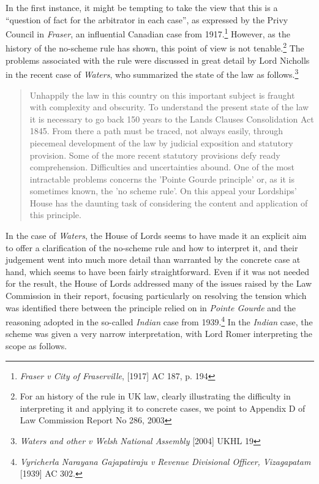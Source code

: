 In the first instance, it might be tempting to take the view that this is a ``question of fact for the arbitrator in each case'', as expressed by the Privy Council in \emph{Fraser}, an influential Canadian case from 1917.\footnote{\emph{Fraser v City of Fraserville}, [1917] AC 187, p. 194} However, as the history of the no-scheme rule has shown, this point of view is not tenable.\footnote{For an history of the rule in UK law, clearly illustrating the difficulty in interpreting it and applying it to concrete cases, we point to Appendix D of Law Commission Report No 286, 2003} The problems associated with the rule were discussed in great detail by Lord Nicholls in the recent case of \emph{Waters}, who summarized the state of the law as follows.\footnote{\emph{Waters and other v Welsh National Assembly} [2004] UKHL 19}

\begin{quote}
Unhappily the law in this country on this important subject is fraught with complexity and obscurity. To understand the present state of the law it is necessary to go back 150 years to the Lands Clauses Consolidation Act 1845. From there a path must be traced, not always easily, through piecemeal development of the law by judicial exposition and statutory provision. Some of the more recent statutory provisions defy ready comprehension. Difficulties and uncertainties abound. One of the most intractable problems concerns the 'Pointe Gourde principle' or, as it is sometimes known, the 'no scheme rule'. On this appeal your Lordships' House has the daunting task of considering the content and application of this principle.
\end{quote}

In the case of \emph{Waters}, the House of Lords seems to have made it an explicit aim to offer a clarification of the no-scheme rule and how to interpret it, and their judgement went into much more detail than warranted by the concrete case at hand, which seems to have been fairly straightforward. Even if it was not needed for the result, the House of Lords addressed many of the issues raised by the Law Commission in their report, focusing particularly on resolving the tension which was identified there between the principle relied on in \emph{Pointe Gourde} and the reasoning adopted in the so-called \emph{Indian} case from 1939.\footnote{\emph{Vyricherla Narayana Gajapatiraju v Revenue Divisional
Officer, Vizagapatam} [1939] AC 302.} In the \emph{Indian} case, the scheme was given a very narrow interpretation, with Lord Romer interpreting the scope as follows.


